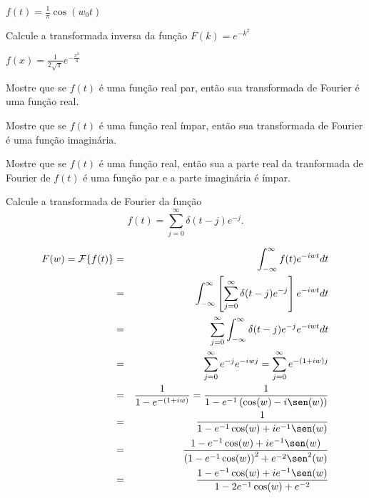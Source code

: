 \begin{resp} $f(t)=\frac{1}{\pi}\cos(w_0t)$
\end{resp}
\begin{exer}{\label{ex_inv_exp_kk}} Calcule a transformada inversa da função $F(k)=e^{-k^2}$
\end{exer}
\begin{resp} $f(x)=\frac{1}{2\sqrt{\pi}} e^{-\frac{x^2}{4}}$
\end{resp}
\begin{exer} Mostre que se $f(t)$ é uma função real par, então sua transformada de Fourier é uma função real.
\end{exer}
\begin{exer} Mostre que se $f(t)$ é uma função real ímpar, então sua transformada de Fourier é uma função imaginária.
\end{exer}
\begin{exer} Mostre que se $f(t)$ é uma função real, então sua a parte real da tranformada de Fourier de $f(t)$ é uma função par e a parte imaginária é ímpar.
\end{exer}
\begin{exer} Calcule a transformada de Fourier da função
\begin{equation}f(t)=\sum_{j=0}^\infty \delta(t-j) e^{-j}.\end{equation}
\end{exer}
\begin{resp} 
\begin{eqnarray*}
F(w)=\mathcal{F}\{f(t)\}&=&\int_{-\infty}^\infty f(t) e^{-i w t}dt\\
&=&\int_{-\infty}^\infty \left[\sum_{j=0}^\infty\delta(t-j)e^{-j}\right] e^{-i w t}dt\\
&=&\sum_{j=0}^\infty\int_{-\infty}^\infty \delta(t-j)e^{-j} e^{-i w t}dt\\
&=&\sum_{j=0}^\infty e^{-j} e^{-i w j}
=\sum_{j=0}^\infty e^{-(1+i w) j}\\
&=&\frac{1}{1-e^{-(1+i w)}}=\frac{1}{1-e^{-1}\left(\cos(w)-i\sen(w)\right)}\\
&=&\frac{1}{1-e^{-1}\cos(w)+ie^{-1}\sen(w)}\\
&=&\frac{1-e^{-1}\cos(w)+ie^{-1}\sen(w)}{\left(1-e^{-1}\cos(w)\right)^2+e^{-2}\sen^2(w)}\\
&=&\frac{1-e^{-1}\cos(w)+ie^{-1}\sen(w)}{1-2e^{-1}\cos(w)+e^{-2}}\\
\end{eqnarray*}
\end{resp}
